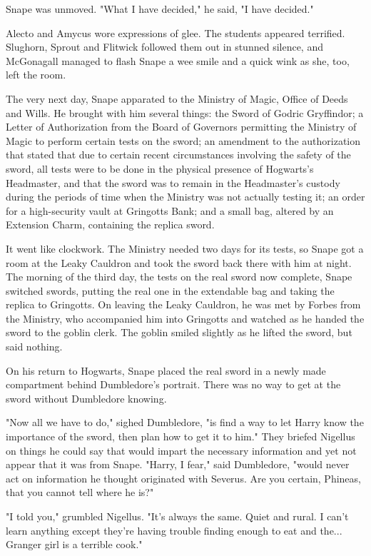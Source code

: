 \documentclass[a4paper,11pt]{article}
\begin{document}
Snape was unmoved. "What I have decided," he said, "I have decided."

Alecto and Amycus wore expressions of glee. The students appeared terrified. Slughorn, Sprout and Flitwick followed them out in stunned silence, and McGonagall managed to flash Snape a wee smile and a quick wink as she, too, left the room.

The very next day, Snape apparated to the Ministry of Magic, Office of Deeds and Wills. He brought with him several things: the Sword of Godric Gryffindor; a Letter of Authorization from the Board of Governors permitting the Ministry of Magic to perform certain tests on the sword; an amendment to the authorization that stated that due to certain recent circumstances involving the safety of the sword, all tests were to be done in the physical presence of Hogwarts's Headmaster, and that the sword was to remain in the Headmaster's custody during the periods of time when the Ministry was not actually testing it; an order for a high-security vault at Gringotts Bank; and a small bag, altered by an Extension Charm, containing the replica sword.

It went like clockwork. The Ministry needed two days for its tests, so Snape got a room at the Leaky Cauldron and took the sword back there with him at night. The morning of the third day, the tests on the real sword now complete, Snape switched swords, putting the real one in the extendable bag and taking the replica to Gringotts. On leaving the Leaky Cauldron, he was met by Forbes from the Ministry, who accompanied him into Gringotts and watched as he handed the sword to the goblin clerk. The goblin smiled slightly as he lifted the sword, but said nothing.

On his return to Hogwarts, Snape placed the real sword in a newly made compartment behind Dumbledore's portrait. There was no way to get at the sword without Dumbledore knowing.

"Now all we have to do," sighed Dumbledore, "is find a way to let Harry know the importance of the sword, then plan how to get it to him." They briefed Nigellus on things he could say that would impart the necessary information and yet not appear that it was from Snape. "Harry, I fear," said Dumbledore, "would never act on information he thought originated with Severus. Are you certain, Phineas, that you cannot tell where he is?"

"I told you," grumbled Nigellus. "It's always the same. Quiet and rural. I can't learn anything except they're having trouble finding enough to eat and the... Granger girl is a terrible cook."
\end{document}
